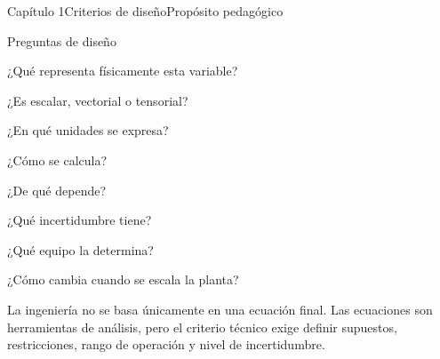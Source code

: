 \documentclass{../plantilla/hvtbook}
\begin{document}
\begin{HVTPage}{Capítulo 1}{Criterios de diseño}{Propósito pedagógico}
\begin{HVTTaskOrdered}{Preguntas de diseño}\item ¿Qué representa físicamente esta variable? \item ¿Es escalar, vectorial o tensorial? \item ¿En qué unidades se expresa? \item ¿Cómo se calcula? \item ¿De qué depende? \item ¿Qué incertidumbre tiene? \item ¿Qué equipo la determina? \item ¿Cómo cambia cuando se escala la planta? \end{HVTTaskOrdered}
\begin{HVTWarning}{La ingeniería no se basa únicamente en una ecuación final. Las ecuaciones son herramientas de análisis, pero el criterio técnico exige definir supuestos, restricciones, rango de operación y nivel de incertidumbre.} \end{HVTWarning}
\end{HVTPage}
\end{document}
